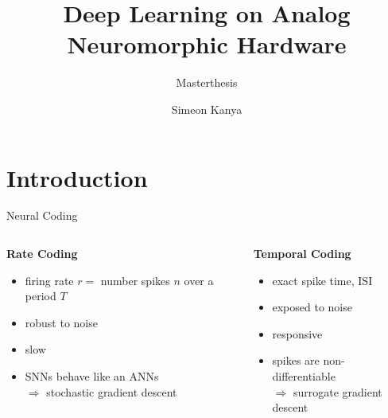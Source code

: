 \documentclass[12pt, aspectratio=169]{beamer}
\title{Deep Learning on Analog Neuromorphic Hardware}
\subtitle{Masterthesis}
\date{}
\author{Simeon Kanya}
\institute{Kirchhoff-Institute for Physics - Electronic Vision(s) Group}
\begin{document}
\maketitle
\section[Intro]{Introduction}

\begin{frame}{Neural Coding}
	\begin{columns}[t]
	\begin{column}{.5\textwidth}
		\textbf{Rate Coding}
		\begin{itemize}
			\item firing rate $r = $ number spikes $n$ over a period $T$
			\item robust to noise
			\item slow
			\item SNNs behave like an ANNs \\
			$\Rightarrow$ stochastic gradient descent
		\end{itemize}
	\end{column}
	\begin{column}{.5\textwidth}
		\textbf{Temporal Coding}
		\begin{itemize}
			\item exact spike time, ISI
			\item exposed to noise
			\item responsive
			\item spikes are non-differentiable\\
			$\Rightarrow$ surrogate gradient descent 
			\end{itemize}
	\end{column}
	\end{columns}
\end{frame}
\end{document}
